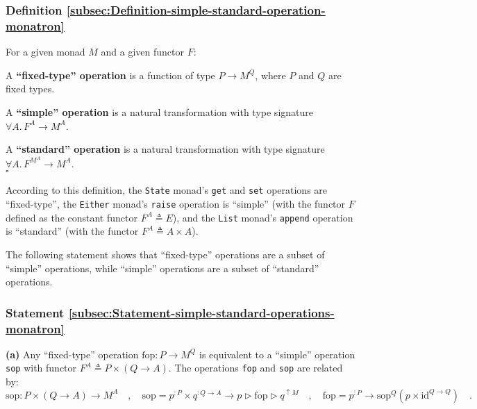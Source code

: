 \subsubsection{Definition \label{subsec:Definition-simple-standard-operation-monatron}\ref{subsec:Definition-simple-standard-operation-monatron}}

For a given monad $M$ and a given functor $F$:

A \textbf{\textsf{``}fixed-type\textsf{''} operation} is a function of type $P\rightarrow M^{Q}$,
where $P$ and $Q$ are fixed types.

A \textbf{\textsf{``}simple\textsf{''} operation} is a natural transformation with
type signature $\forall A.\,F^{A}\rightarrow M^{A}$.

A \textbf{\textsf{``}standard\textsf{''} operation} is a natural transformation with
type signature $\forall A.\,F^{M^{A}}\rightarrow M^{A}$.\\
$\square$

According to this definition, the \lstinline!State! monad\textsf{'}s \lstinline!get!
and \lstinline!set! operations are \textsf{``}fixed-type\textsf{''}, the \lstinline!Either!
monad\textsf{'}s \lstinline!raise! operation is \textsf{``}simple\textsf{''} (with the functor
$F$ defined as the constant functor $F^{A}\triangleq E$), and the
\lstinline!List! monad\textsf{'}s \lstinline!append! operation is \textsf{``}standard\textsf{''}
(with the functor $F^{A}\triangleq A\times A$). 

The following statement shows that \textsf{``}fixed-type\textsf{''} operations are
a subset of \textsf{``}simple\textsf{''} operations, while \textsf{``}simple\textsf{''} operations
are a subset of \textsf{``}standard\textsf{''} operations.

\subsubsection{Statement \label{subsec:Statement-simple-standard-operations-monatron}\ref{subsec:Statement-simple-standard-operations-monatron}}

\textbf{(a)} Any \textsf{``}fixed-type\textsf{''} operation $\text{fop}:P\rightarrow M^{Q}$
is  equivalent to a \textsf{``}simple\textsf{''} operation \lstinline!sop! with functor
$F^{A}\triangleq P\times\left(Q\rightarrow A\right)$. The operations
\lstinline!fop! and \lstinline!sop! are related by:
\[
\text{sop}:P\times\left(Q\rightarrow A\right)\rightarrow M^{A}\quad,\quad\text{sop}=p^{:P}\times q^{:Q\rightarrow A}\rightarrow p\triangleright\text{fop}\triangleright q^{\uparrow M}\quad,\quad\text{fop}=p^{:P}\rightarrow\text{sop}^{Q}(p\times\text{id}^{Q\rightarrow Q})\quad.
\]

